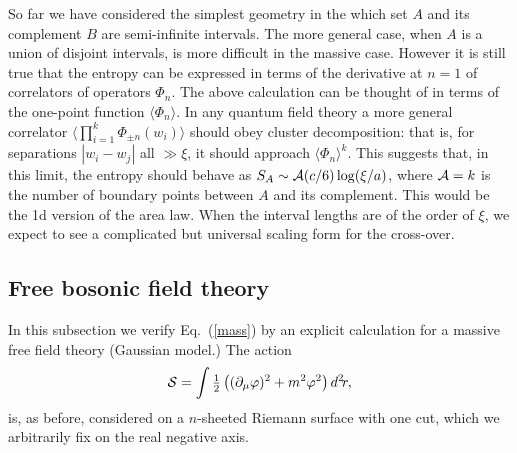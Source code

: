 \documentclass[12pt,aps]{revtex4}
\def\ffrac#1#2{\textstyle{#1\over#2}\displaystyle}
\begin{document}
So far we have considered the simplest geometry in the which set $A$ and
its complement $B$ are semi-infinite intervals. The more general case,
when $A$ is a union of disjoint intervals, is more difficult in the
massive case. However it is still true that the entropy can be expressed
in terms of the derivative at $n=1$ of correlators of operators
$\Phi_n$. The above calculation can be thought of in terms of the
one-point function $\langle\Phi_n\rangle$. In any quantum field theory
a more general correlator
$\langle\prod_{i=1}^{k}\Phi_{\pm n}(w_i)\rangle$ should obey cluster
decomposition: that is, for separations $|w_i-w_j|$ all $\gg\xi$, it
should approach $\langle\Phi_n\rangle^{k}$. This suggests that, in this
limit, the entropy should behave as $S_A\sim{\cal A}(c/6)\log(\xi/a)$,
where ${\cal A}=k$ is the number of boundary points between $A$ and its
complement. This would be the 1d version of the area
law\cite{s-93}. When the interval lengths are of the order of
$\xi$, we expect to see a complicated but universal scaling form for the
cross-over.


\def\be{\begin{equation}}
\def\ee{\end{equation}}

\def\bea{\begin{eqnarray}}
\def\eea{\end{eqnarray}}

\def\e{\epsilon}

\subsection{Free bosonic field theory}

In this subsection we verify Eq.~(\ref{mass}) by an explicit calculation for a
massive free field theory (Gaussian model.)
The action
\be
{\cal S}=\int \ffrac12
\left((\partial_\mu\varphi)^2+m^2\varphi^2\right)d^2\!r,
\ee
is, as before,
considered on a $n$-sheeted Riemann surface with one cut, which we
arbitrarily fix on the real negative axis.
\end{document}
